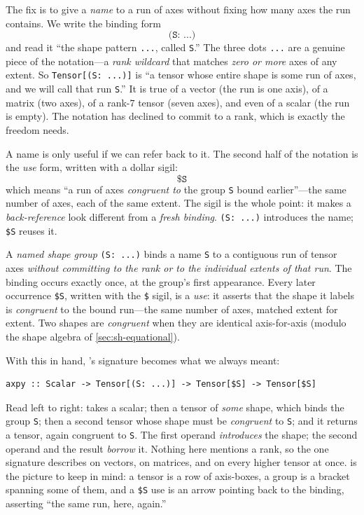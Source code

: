The fix is to give a \emph{name} to a run of axes without fixing how many
axes the run contains. We write the binding form
\[
  \texttt{(S: ...)}
\]
and read it ``the shape pattern \texttt{...}, called \texttt{S}.'' The three
dots \texttt{...} are a genuine piece of the notation---a \emph{rank
wildcard} that matches \emph{zero or more} axes of any extent. So
\lstinline[style=l4style]|Tensor[(S: ...)]| is ``a tensor whose entire shape
is some run of axes, and we will call that run \texttt{S}.'' It is true of a
vector (the run is one axis), of a matrix (two axes), of a rank-$7$ tensor
(seven axes), and even of a scalar (the run is empty). The notation has
declined to commit to a rank, which is exactly the freedom  needs.

A name is only useful if we can refer back to it. The second half of the
notation is the \emph{use} form, written with a dollar sigil:
\[
  \texttt{\$S}
\]
which means ``a run of axes \emph{congruent to} the group \texttt{S} bound
earlier''---the same number of axes, each of the same extent. The sigil is
the whole point: it makes a \emph{back-reference} look different from a
\emph{fresh binding}. \lstinline[style=l4style]|(S: ...)| introduces the name;
\lstinline[style=l4style]|$S| reuses it.

\begin{definition}
\label{def:sh-group}
A \emph{named shape group} \lstinline[style=l4style]|(S: ...)| binds a name
\texttt{S} to a contiguous run of tensor axes \emph{without committing to the
rank or to the individual extents of that run}. The binding occurs exactly
once, at the group's first appearance. Every later occurrence
\lstinline[style=l4style]|$S|, written with the \texttt{\$} sigil, is a
\emph{use}: it asserts that the shape it labels is \emph{congruent} to the
bound run---the same number of axes, matched extent for extent. Two shapes
are \emph{congruent} when they are identical axis-for-axis (modulo the
shape algebra of \cref{sec:sh-equational}).
\end{definition}

With this in hand, 's signature becomes what we always meant:
\begin{lstlisting}[style=l4style]
axpy :: Scalar -> Tensor[(S: ...)] -> Tensor[$S] -> Tensor[$S]
\end{lstlisting}
Read left to right:  takes a scalar; then a tensor of \emph{some}
shape, which binds the group \texttt{S}; then a second tensor whose shape must
be \emph{congruent} to \texttt{S}; and it returns a tensor, again congruent
to \texttt{S}. The first operand \emph{introduces} the shape; the second
operand and the result \emph{borrow} it. Nothing here mentions a rank, so the
one signature describes  on vectors, on matrices, and on every
higher tensor at once.  is the picture to keep in mind: a
tensor is a row of axis-boxes, a group is a bracket spanning some of them, and
a \lstinline[style=l4style]|$S| use is an arrow pointing back to the binding,
asserting ``the same run, here, again.''

